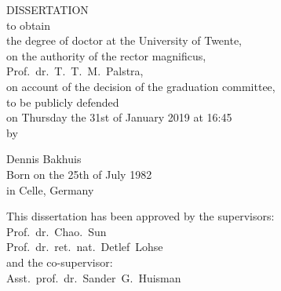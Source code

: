 \begin{center}
{\Large \textsc{\thesistitle}}

\vspace{1cm}

DISSERTATION\\

\vspace{10mm}
to obtain\\
the degree of doctor at the University of Twente,\\
on the authority of the rector magnificus,\\
Prof.~dr.~T.~T.~M.~Palstra,\\
on account of the decision of the graduation committee,\\
to be publicly defended\\
on Thursday the 31st of January 2019 at 16:45\\

\vspace{0.5cm}
by

\vspace{0.5cm}

Dennis Bakhuis\\
Born on the 25th of July 1982\\
in Celle, Germany\\

\newpage
\thispagestyle{empty}

This dissertation has been approved by the supervisors:\\
\vspace{0.5cm}
Prof.~dr.~Chao.~Sun\\%
Prof.~dr.~ret.~nat.~Detlef~Lohse\\
\vspace{0.5cm}
and the co-supervisor:\\
\vspace{0.5cm}
Asst.~prof.~dr.~Sander~G.~Huisman

\end{center}

